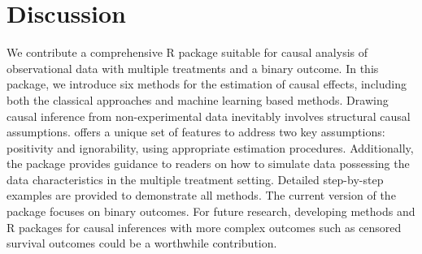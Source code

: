 \section{Discussion}
 We contribute a comprehensive R package  suitable for causal analysis of observational data with multiple treatments and a binary outcome. In this package, we introduce six methods for the estimation of causal effects, including both the classical approaches and machine learning based methods. Drawing causal inference from non-experimental data inevitably involves structural causal assumptions.  offers a unique set of features to address two key assumptions: positivity and ignorability, using appropriate estimation procedures. Additionally,  the  package provides guidance to readers on how to simulate data possessing the data characteristics in the multiple treatment setting. Detailed step-by-step examples are provided to demonstrate all methods.  The current version of the  package focuses on binary outcomes. For future research, developing methods and R packages for causal inferences with more complex outcomes such as censored survival outcomes \citep{hu2022aflexible} could be a worthwhile contribution. 
 





\address{Liangyuan Hu\\
  Rutgers University School of Public Health\\
  Department of Biostatistics and Epidemiology\\ 
  683 Hoes Lane West\\
  Piscataway, NJ 08854, United States of America\\
  }

\address{Jiayi Ji\\
  Rutgers University School of Public Health\\
  Department of Biostatistics and Epidemiology\\
  683 Hoes Lane West\\
  Piscataway, NJ 08854, United States of America\\
}

